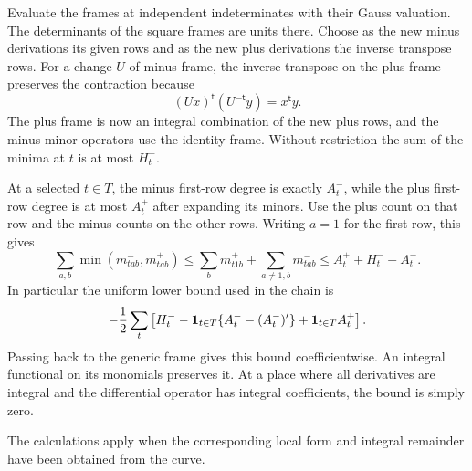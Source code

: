 Evaluate the frames at independent indeterminates with their
Gauss valuation. The determinants of the square frames are
units there. Choose as the new minus derivations its given rows
and as the new plus derivations the inverse transpose rows.
For a change \(U\) of minus frame, the inverse transpose on the plus frame preserves the contraction because
\[
  (U x)^{\mathsf t}(U^{-\mathsf t}y)=x^{\mathsf t}y.
\]
 The plus frame is now an integral combination of the
new plus rows, and the minus minor operators use the identity
frame. Without restriction the sum of the minima at \(t\)
is at most \(H_t^-\).

At a selected \(t\in T\), the minus
first-row degree is exactly \(A^-_t\), while the plus first-row
degree is at most \(A^+_t\) after expanding its minors. Use
the plus count on that row and the minus counts on the other
rows. Writing \(a=1\) for the first row, this gives
\[
  \sum_{a,b}\min(m^-_{tab},m^+_{tab})\le \sum_b m^+_{t1b}+\sum_{a\ne1,b}m^-_{tab}\le A_t^+ +H_t^- - A_t^-.
\]
In particular the uniform lower bound used in the chain is
\[
 -\frac12\sum_t\left[H_t^-
       -{\bf1}_{t\in T}\{A^-_t-(A^-_t)'\}
       +{\bf1}_{t\in T} A^+_t\right].
\]
Passing back to the generic frame gives this bound coefficientwise.
An integral functional on its monomials preserves it. At a
place where all derivatives are integral and the differential
operator has integral coefficients, the bound is simply zero.

The calculations apply when the corresponding local form and
integral remainder have been obtained from the curve.
\label{cor:integral-jets-1}
